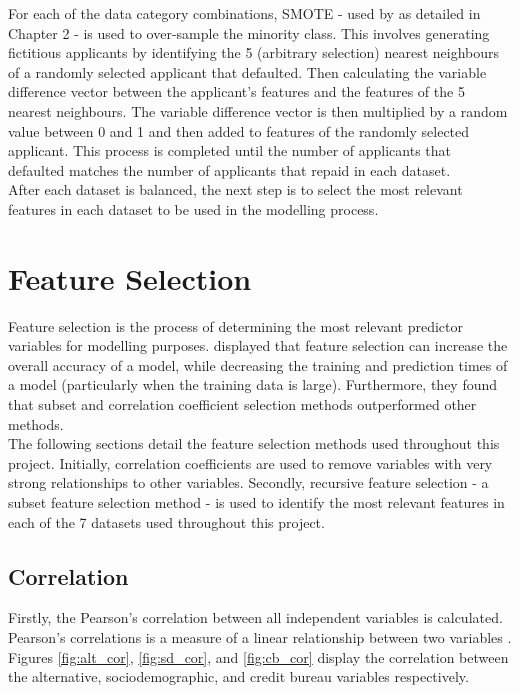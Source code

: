 For each of the data category combinations, SMOTE - used by \textcite{NNShen} as detailed in Chapter 2 - is used to over-sample the minority class. This involves generating fictitious applicants by identifying the 5 (arbitrary selection) nearest neighbours of a randomly selected applicant that defaulted. Then calculating the variable difference vector between the applicant's features and the features of the 5 nearest neighbours. The variable difference vector is then multiplied by a random value between 0 and 1 and then added to features of the randomly selected applicant. This process is completed until the number of applicants that defaulted matches the number of applicants that repaid in each dataset. \\

After each dataset is balanced, the next step is to select the most relevant features in each dataset to be used in the modelling process. \\

\section{Feature Selection}

Feature selection is the process of determining the most relevant predictor variables for modelling purposes. \textcite{FeatureSelection} displayed that feature selection can increase the overall accuracy of a model, while decreasing the training and prediction times of a model (particularly when the training data is large). Furthermore, they found that subset and correlation coefficient selection methods outperformed other methods. \\

The following sections detail the feature selection methods used throughout this project. Initially, correlation coefficients are used to remove variables with very strong relationships to other variables. Secondly, recursive feature selection - a subset feature selection method - is used to identify the most relevant features in each of the 7 datasets used throughout this project. 

\subsection{Correlation}

Firstly, the Pearson's correlation between all independent variables is calculated. Pearson's correlations is a measure of a linear relationship between two variables \parencite{correlation1}. Figures \ref{fig:alt_cor}, \ref{fig:sd_cor}, and \ref{fig:cb_cor} display the correlation between the alternative, sociodemographic, and credit bureau variables respectively. \\

